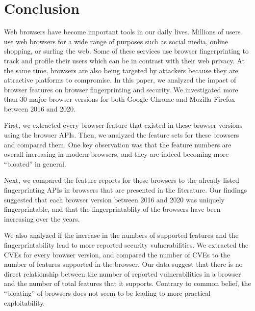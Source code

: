 \section{Conclusion}
\label{sec:conclusion}

Web browsers have become important tools in our daily lives.
Millions of users use web browsers for a wide range of purposes such
as social media, online shopping, or surfing the web. Some of these
services use browser fingerprinting to track and profile their users
which can be in contrast with their web privacy. At the same time,
browsers are also being targeted by attackers because they are
attractive platforms to compromise. In this paper, we analyzed the
impact of browser features on browser fingerprinting and security. We
investigated more than 30 major browser versions for both Google
Chrome and Mozilla Firefox between 2016 and 2020.

First, we extracted every browser feature that existed in these
browser versions using the browser APIs. Then, we analyzed the feature
sets for these browsers and compared them. One key observation was
that the feature numbers are overall increasing in modern browsers,
and they are indeed becoming more ``bloated'' in general.

Next, we compared the feature reports for these browsers to the
already listed fingerprinting APIs in browsers that are presented in the
literature. Our findings suggested that each browser version between 2016
and 2020 was uniquely fingerprintable, and that the fingerprintablity
of the browsers have been increasing over the years.

We also analyzed if the increase in the numbers of supported features
and the fingerprintability lead to more reported security
vulnerabilities. We extracted the CVEs for every browser version, and
compared the number of CVEs to the number of features supported in the
browser. Our data suggest that there is no direct relationship
between the number of reported vulnerabilities in a browser and the number of
total features that it supports. Contrary to common belief, the
``bloating'' of browsers does not seem to be leading to more
practical exploitability.
